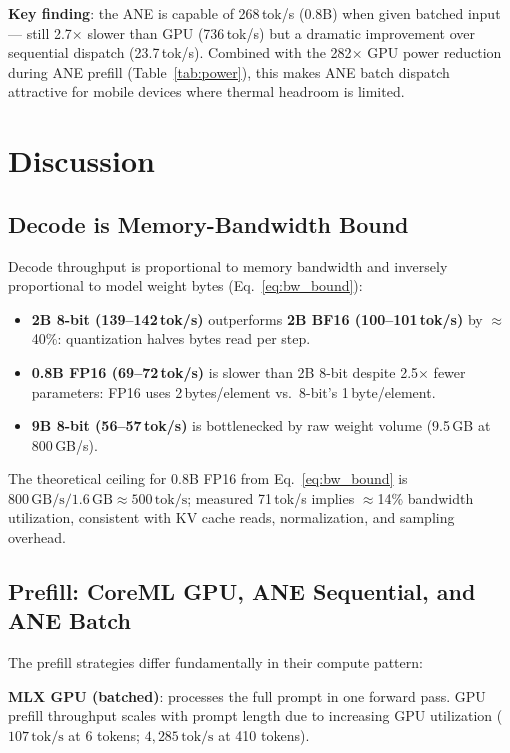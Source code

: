 \documentclass[11pt]{article}
\begin{document}
\textbf{Key finding}: the ANE is capable of 268\,tok/s (0.8B) when given
batched input --- still 2.7$\times$ slower than GPU (736\,tok/s) but a
dramatic improvement over sequential dispatch (23.7\,tok/s).
Combined with the 282$\times$ GPU power reduction during ANE prefill
(Table~\ref{tab:power}), this makes ANE batch dispatch attractive for
mobile devices where thermal headroom is limited.

\section{Discussion}
\label{sec:discussion}

\subsection{Decode is Memory-Bandwidth Bound}

Decode throughput is proportional to memory bandwidth and inversely
proportional to model weight bytes (Eq.~\ref{eq:bw_bound}):
\begin{itemize}[topsep=2pt,itemsep=1pt]
  \item \textbf{2B 8-bit (139--142\,tok/s)} outperforms \textbf{2B BF16
    (100--101\,tok/s)} by $\approx$40\%: quantization halves bytes read per step.
  \item \textbf{0.8B FP16 (69--72\,tok/s)} is slower than 2B 8-bit despite
    2.5$\times$ fewer parameters: FP16 uses 2\,bytes/element vs.\
    8-bit's 1\,byte/element.
  \item \textbf{9B 8-bit (56--57\,tok/s)} is bottlenecked by raw weight volume
    (9.5\,GB at 800\,GB/s).
\end{itemize}

The theoretical ceiling for 0.8B FP16 from Eq.~\ref{eq:bw_bound} is
$800\,\text{GB/s} / 1.6\,\text{GB} \approx 500\,\text{tok/s}$;
measured 71\,tok/s implies $\approx$14\% bandwidth utilization,
consistent with KV cache reads, normalization, and sampling overhead.

\subsection{Prefill: CoreML GPU, ANE Sequential, and ANE Batch}

The prefill strategies differ fundamentally in their compute pattern:

\textbf{MLX GPU (batched)}: processes the full prompt in one forward pass.
GPU prefill throughput scales with prompt length due to increasing GPU
utilization ($107\,\text{tok/s}$ at 6 tokens; $4{,}285\,\text{tok/s}$ at
410 tokens).
\end{document}
